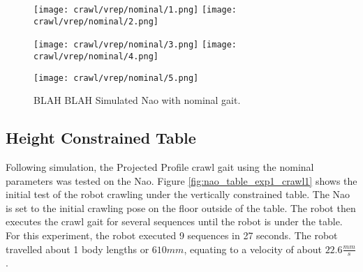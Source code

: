 \begin{figure}
  \centerline{
    \texttt{[image: crawl/vrep/nominal/1.png]}
    \texttt{[image: crawl/vrep/nominal/2.png]}
  }
  \centerline{
    \texttt{[image: crawl/vrep/nominal/3.png]}
    \texttt{[image: crawl/vrep/nominal/4.png]}
  }
  \centerline{
    \texttt{[image: crawl/vrep/nominal/5.png]}
  }
  \caption{BLAH BLAH Simulated Nao with nominal gait.}
  \label{fig:vrep_nao_nom_gait1}
\end{figure}

\subsection{Height Constrained Table}


Following simulation, the Projected Profile crawl gait using the nominal parameters
was tested on the Nao. Figure \ref{fig:nao_table_exp1_crawl1} shows the initial test of the
robot crawling under the vertically constrained table. The Nao is set to the initial
crawling pose on the floor outside of the table. The robot then executes the crawl
gait for several sequences until the robot is under the table.
For this experiment, the robot executed 9 sequences in 27 seconds. The robot travelled
about 1 body lengths or $610 mm$, equating to a velocity of about $22.6 \frac{mm}{s}$.


